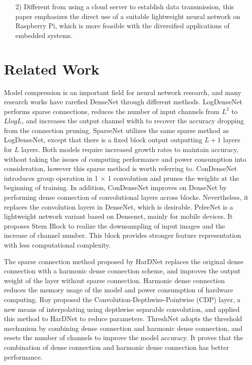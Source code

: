 \documentclass[default,iicol]{sn-jnl}
\theoremstyle{thmstyleone}\newtheorem{theorem}{Theorem}\newtheorem{proposition}[theorem]{Proposition}
\theoremstyle{thmstyletwo}\newtheorem{example}{Example}\newtheorem{remark}{Remark}
\theoremstyle{thmstylethree}\newtheorem{definition}{Definition}
\begin{document}
\begin{itemize}
    \item [2)]
    Different from using a cloud server to establish data transmission, this paper emphasizes the direct use of a suitable lightweight neural network on Raspberry Pi, which is more feasible with the diversified applications of embedded systems.
\end{itemize}


\section{Related Work}
Model compression is an important field for neural network research, and many research works have rarefied DenseNet through different methods. LogDenseNet \cite{hu2017log} performs sparse connections, reduces the number of input channels from $L^2$ to $Llog{L}$, and increases the output channel width to recover the accuracy dropping from the connection pruning. SparseNet \cite{liu2018sparsenet} utilizes the same sparse method as LogDenseNet, except that there is a fixed block output outputting $L+1$ layers for $L$ layers. Both models require increased growth rates to maintain accuracy, without taking the issues of computing performance and power consumption into consideration, however this sparse method is worth referring to. ConDenseNet \cite{huang2018condensenet} introduces group operation in 1 × 1 convolution and prunes the weights at the beginning of training. In addition, ConDenseNet improves on DenseNet by performing dense connection of convolutional layers across blocks. Nevertheless, it replaces the convolution layers in DenseNet, which is desirable. PeleeNet \cite{wang2018pelee} is a lightweight network variant based on Densenet, mainly for mobile devices. It proposes Stem Block to realize the downsampling of input images and the increase of channel number. This block provides stronger feature representation with less computational complexity.

The sparse connection method proposed by HarDNet \cite{chao2019hardnet} replaces the original dense connection with a harmonic dense connection scheme, and improves the output weight of the layer without sparse connection. Harmonic dense connection reduces the memory usage of the model and power consumption of hardware computing. Roy \cite{miles2021compressing} proposed the Convolution-Depthwise-Pointwise (CDP) layer, a new means of interpolating using depthwise separable convolution, and applied this method to HarDNet to reduce parameters. ThreshNet \cite{ju2022threshnet} adopts the threshold mechanism by combining dense connection and harmonic dense connection, and resets the number of channels to improve the model accuracy. It proves that the combination of dense connection and harmonic dense connection has better performance.
\end{document}
